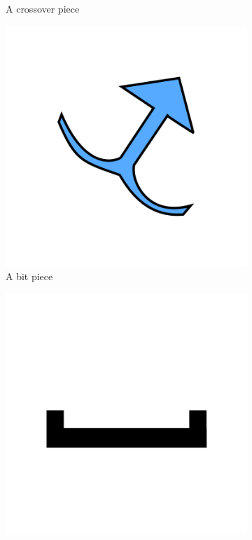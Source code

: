 \documentclass{l4proj}
\begin{document}
\begin{figure}
\begin{subfigure}[b]{0.3\textwidth}
        \caption{A crossover piece}
        \label{fig:crossover}
    \end{subfigure}
    \begin{subfigure}[b]{0.3\textwidth}
        \includegraphics[width=1\textwidth]{images/bit.png}
        \caption{A bit piece}
        \label{fig:bit}
    \end{subfigure}
    \begin{subfigure}[b]{0.3\textwidth}
        \includegraphics[width=1\textwidth]{images/interceptor.png}

\end{subfigure}
\end{figure}
\end{document}
